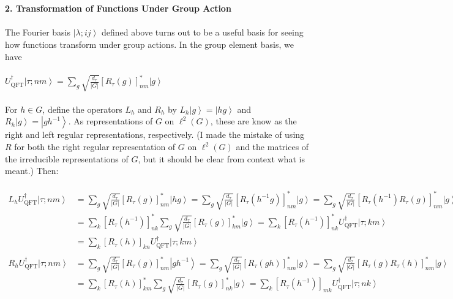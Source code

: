 \documentclass[]{article}
\begin{document}
\\
\\
\textbf{2. Transformation of Functions Under Group Action}\\
\\
The Fourier basis $\left\vert \lambda;ij\right\rangle$ defined above turns out to be a useful basis for seeing how functions transform under group actions. In the group element basis, we have\\
\\
$U_\text{QFT}^\dagger\left\vert \tau;nm\right\rangle=\sum_g\sqrt{\frac{d_\tau}{\left\vert G\right\vert}}\left[R_\tau(g)\right]_{nm}^*\left\vert g\right\rangle$\\
\\
For $h\in G$, define the operators $L_h$ and $R_h$ by $L_h\left\vert g\right\rangle=\left\vert hg\right\rangle$ and $R_h\left\vert g\right\rangle=\left\vert gh^{-1}\right\rangle$. As representations of $G$ on $\ell^2(G)$, these are know as the right and left regular representations, respectively. (I made the mistake of using $R$ for both the right regular representation of $G$ on $\ell^2(G)$ and the matrices of the irreducible representations of $G$, but it should be clear from context what is meant.) Then:\\
\\
$\begin{aligned}
L_hU_\text{QFT}^\dagger\left\vert\tau;nm\right\rangle&=\sum_g\sqrt{\frac{d_\tau}{\left\vert G\right\vert}}\left[R_\tau(g)\right]_{nm}^*\left\vert hg\right\rangle=\sum_g\sqrt{\frac{d_\tau}{\left\vert G\right\vert}}\left[R_\tau(h^{-1}g)\right]_{nm}^*\left\vert g\right\rangle=\sum_g\sqrt{\frac{d_\tau}{\left\vert G\right\vert}}\left[R_\tau(h^{-1})R_\tau(g)\right]_{nm}^*\left\vert g\right\rangle\\
&=\sum_k\left[R_\tau(h^{-1})\right]_{nk}^*\sum_g\sqrt{\frac{d_\tau}{\left\vert G\right\vert}}\left[R_\tau(g)\right]_{km}^*\left\vert g\right\rangle=\sum_k\left[R_\tau(h^{-1})\right]_{nk}^*U_\text{QFT}^\dagger\left\vert\tau;km\right\rangle\\
&=\sum_k\left[R_\tau(h)\right]_{kn}U_\text{QFT}^\dagger\left\vert\tau;km\right\rangle\\
\\
R_hU_\text{QFT}^\dagger\left\vert\tau;nm\right\rangle&=\sum_g\sqrt{\frac{d_\tau}{\left\vert G\right\vert}}\left[R_\tau(g)\right]_{nm}^*\left\vert gh^{-1}\right\rangle=\sum_g\sqrt{\frac{d_\tau}{\left\vert G\right\vert}}\left[R_\tau(gh)\right]_{nm}^*\left\vert g\right\rangle=\sum_g\sqrt{\frac{d_\tau}{\left\vert G\right\vert}}\left[R_\tau(g)R_\tau(h)\right]_{nm}^*\left\vert g\right\rangle\\
&=\sum_k\left[R_\tau(h)\right]_{km}^*\sum_g\sqrt{\frac{d_\tau}{\left\vert G\right\vert}}\left[R_\tau(g)\right]_{nk}^*\left\vert g\right\rangle=\sum_k\left[R_\tau(h^{-1})\right]_{mk}U_\text{QFT}^\dagger\left\vert\tau;nk\right\rangle
\end{aligned}$\\
\end{document}
